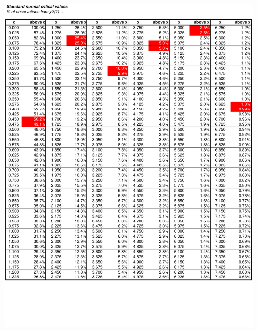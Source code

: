 \documentclass[8pt,letterpaper, landscape]{extarticle} %
\begin{document}
\begin{center}
\includegraphics[height=9.75in, angle=90]{images/cv3}

\end{center}
\end{document}
